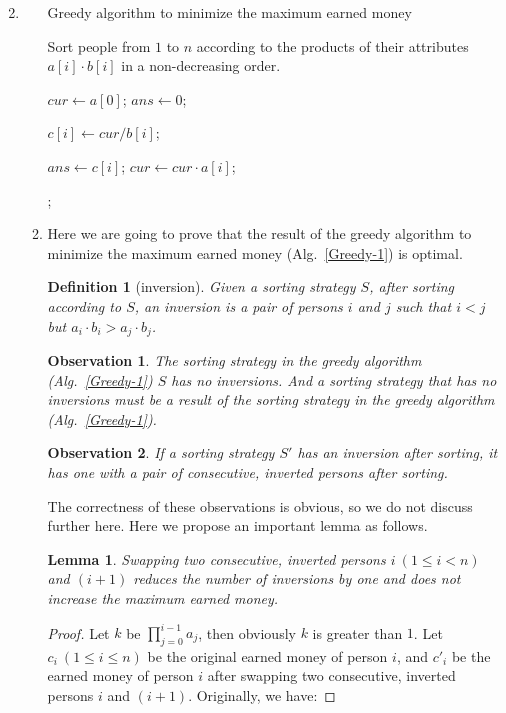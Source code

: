 \documentclass[12pt,a4paper]{article}
\makeatletter
\newtheorem{lemma}[theorem]{Lemma}
\newtheorem*{solution}{Solution}
\newtheorem*{ndefinition}{Definition}
\newtheorem*{observation}{Observation}
\theoremstyle{definition}
\renewenvironment{solution}[1][Solution] {\par\pushQED{\qed}\normalfont\topsep6\p@\@plus6\p@\relax\trivlist\item[\hskip\labelsep\bfseries#1\@addpunct{.}]\ignorespaces}{\popQED\endtrivlist\@endpefalse} \makeatother
\makeatother
\begin{document}
\begin{enumerate}
\begin{solution}
\begin{enumerate}
\begin{minipage}[t]{0.8\textwidth}
\begin{algorithm}[H]
            \BlankLine
            \caption{Greedy algorithm to minimize the maximum earned money}
            \label{Greedy-1}
            Sort people from $1$ to $n$ according to the products of their attributes $a[i] \cdot b[i]$ in a non-decreasing order.

            $cur \leftarrow a[0]$; $ans \leftarrow 0$;

             {
                $c[i] \leftarrow cur / b[i]$;

                 {
                    $ans \leftarrow c[i]$;
                }
                $cur \leftarrow cur \cdot a[i]$;
            }
            ;
        \end{algorithm}
        \end{minipage}
   \item Here we are going to prove that the result of the greedy algorithm to minimize the maximum earned money (Alg.~\ref{Greedy-1}) is optimal.
         \begin{ndefinition}[inversion]
         Given a sorting strategy $S$, after sorting according to $S$, an inversion is a pair of persons $i$ and $j$ such that $i < j$ but $a_i \cdot b_i > a_j \cdot b_j$.
         \end{ndefinition}
         \begin{observation}
         The sorting strategy in the greedy algorithm (Alg.~\ref{Greedy-1}) $S$ has no inversions. And a sorting strategy that has no inversions must be a result of the sorting strategy in the greedy algorithm (Alg.~\ref{Greedy-1}).
         \end{observation}
         \begin{observation}
         If a sorting strategy $S'$ has an inversion after sorting, it has one with a pair of consecutive, inverted persons after sorting.
         \end{observation}
         The correctness of these observations is obvious, so we do not discuss further here. Here we propose an important lemma as follows.
         \begin{lemma}\label{lemma1}
         Swapping two consecutive, inverted persons $i\ (1 \leq i < n)$ and $(i+1)$ reduces the number of inversions by one and does not increase the maximum earned money.
         \end{lemma}
         \begin{proof}
         Let $k$ be $\prod_{j=0}^{i-1}{a_j}$, then obviously $k$ is greater than $1$. Let $c_i\ (1 \leq i \leq n)$ be the original earned money of person $i$, and $c'_i$ be the earned money of person $i$ after swapping two consecutive, inverted persons $i$ and $(i+1)$. Originally, we have:

\end{proof}
\end{enumerate}
\end{solution}
\end{enumerate}
\end{document}
